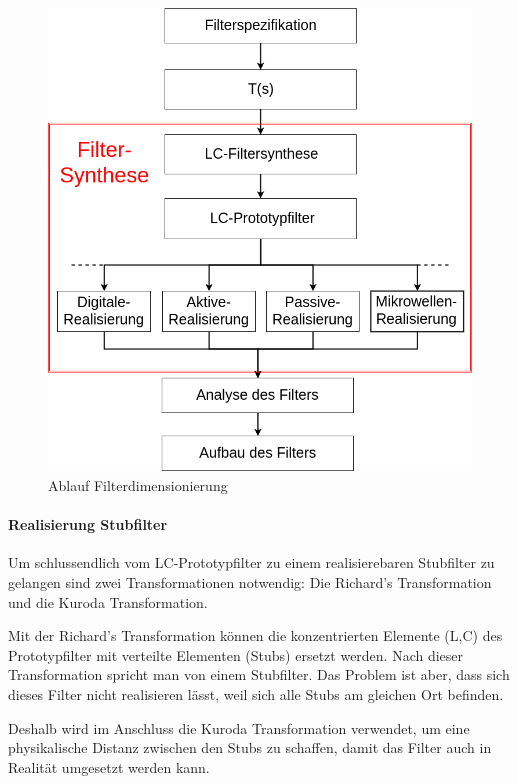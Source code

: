 \begin{figure}[h!]
\centering
 	\includegraphics[width=\imagewidth]{images/Ablauf_Filterdimensionierung_Allgemein.png}
 	\caption{Ablauf Filterdimensionierung}
 	\label{fig:Ablauf_Filterdimensionierung_Allgemein}
\end{figure}


\paragraph{Realisierung Stubfilter}

Um schlussendlich vom LC-Prototypfilter zu einem realisierebaren Stubfilter zu gelangen sind zwei Transformationen notwendig: Die Richard's Transformation und die Kuroda Transformation.

Mit der Richard's Transformation können die konzentrierten Elemente (L,C) des Prototypfilter mit verteilte Elementen (Stubs) ersetzt werden. Nach dieser Transformation spricht man von einem Stubfilter. Das Problem ist aber, dass sich dieses Filter nicht realisieren lässt, weil sich alle Stubs am gleichen Ort befinden. 

Deshalb wird im Anschluss die Kuroda Transformation verwendet,  um eine physikalische Distanz zwischen
den  Stubs  zu  schaffen, damit das Filter auch in Realit\"at umgesetzt  werden  kann.


